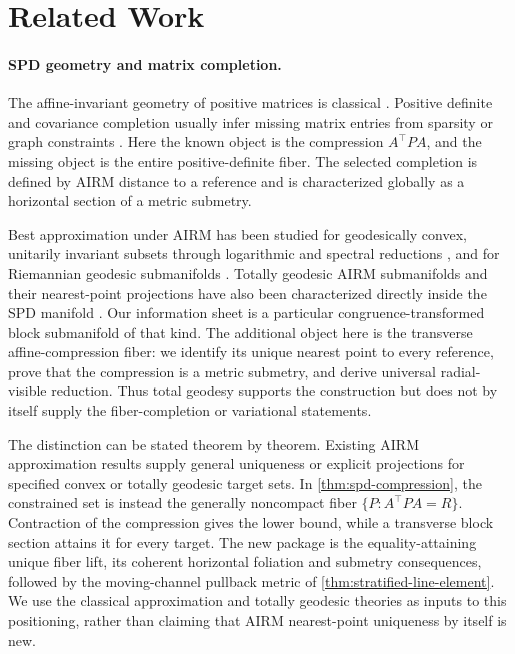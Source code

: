 \section{Related Work}
\label{sec:related}

\paragraph{SPD geometry and matrix completion.}
The affine-invariant geometry of positive matrices is classical
\citep{bhatia2007positive,pennec2006riemannian}.  Positive definite and
covariance completion usually infer missing matrix entries from sparsity or
graph constraints \citep{dempster1972covariance,grone1984positive}.  Here the
known object is the compression \(A^\top P A\), and the missing object is the
entire positive-definite fiber.  The selected completion is defined by AIRM
distance to a reference and is characterized globally as a horizontal
section of a metric submetry.

Best approximation under AIRM has been studied for geodesically convex,
unitarily invariant subsets through logarithmic and spectral reductions
\citep{bhatia2014approximation}, and for Riemannian geodesic submanifolds
\citep{lim2004best}.  Totally geodesic AIRM submanifolds and their
nearest-point projections have also been characterized directly inside the SPD
manifold \citep{tumpach2024totally}.  Our information sheet is a particular
congruence-transformed block submanifold of that kind.  The additional object
here is the transverse affine-compression fiber: we identify its unique
nearest point to every reference, prove that the compression is a metric
submetry, and derive universal radial-visible reduction.  Thus total geodesy
supports the construction but does not by itself supply the fiber-completion
or variational statements.

The distinction can be stated theorem by theorem.  Existing AIRM
approximation results supply general uniqueness or explicit projections for
specified convex or totally geodesic target sets.  In
\cref{thm:spd-compression}, the constrained set is instead the generally
noncompact fiber \(\{P:A^\top PA=R\}\).  Contraction of the compression gives
the lower bound, while a transverse block section attains it for every target.
The new package is the equality-attaining unique fiber lift, its coherent
horizontal foliation and submetry consequences, followed by the
moving-channel pullback metric of \cref{thm:stratified-line-element}.  We use
the classical approximation and totally geodesic theories as inputs to this
positioning, rather than claiming that AIRM nearest-point uniqueness by itself
is new.

